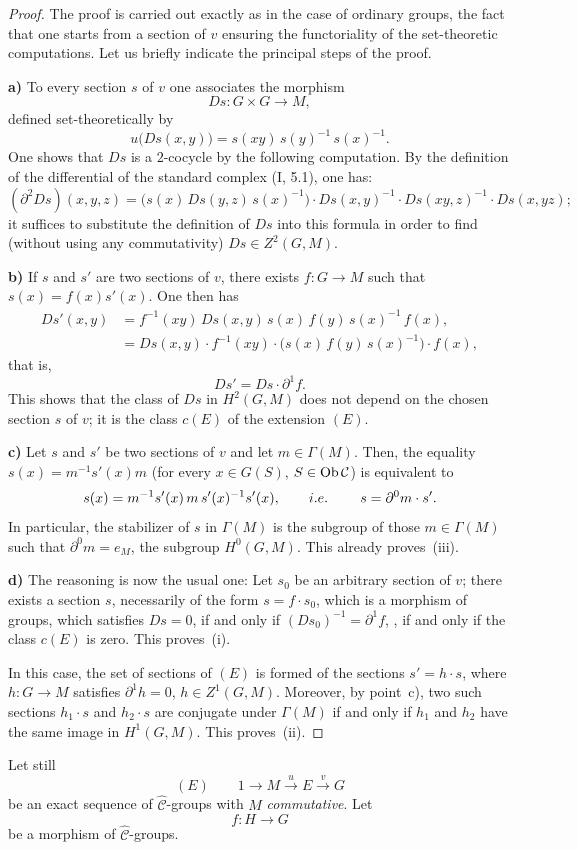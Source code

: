 \begin{proof}
The proof is carried out exactly as in the case of ordinary groups, the
fact that one starts from a section of \(v\) ensuring the functoriality of
the set-theoretic computations. Let us briefly indicate the principal steps
of the proof.

\textbf{a)} To every section \(s\) of \(v\) one associates the morphism
\[
Ds\colon G\times G\longrightarrow M,
\]
defined set-theoretically by
\[
u\bigl(Ds(x, y)\bigr)=s(xy)\,s(y)^{-1}\,s(x)^{-1}.
\]
One shows that \(Ds\) is a \(2\)-cocycle by the following
computation.%
{\renewcommand{\thefootnote}{(43)}}
By the definition of the differential of the standard complex (I, 5.1), one
has:
\[
(\partial^{2}Ds)(x, y, z)
  =\bigl(s(x)\,Ds(y, z)\,s(x)^{-1}\bigr)
  \cdot Ds(x, y)^{-1}
  \cdot Ds(xy, z)^{-1}
  \cdot Ds(x, yz);
\]
it suffices to substitute the definition of \(Ds\) into this formula in
order to find (without using any commutativity) \(Ds\in Z^{2}(G, M)\).

\textbf{b)} If \(s\) and \(s'\) are two sections of \(v\), there exists
\(f\colon G\to M\) such that \(s(x)=f(x)s'(x)\). One then has
\begin{align*}
Ds'(x, y)
  &=f^{-1}(xy)\,Ds(x, y)\,s(x)\,f(y)\,s(x)^{-1}\,f(x),\\
  &=Ds(x, y)\cdot f^{-1}(xy)
    \cdot\bigl(s(x)\,f(y)\,s(x)^{-1}\bigr)\cdot f(x),
\end{align*}
that is,
\[
Ds'=Ds\cdot\partial^{1}f.
\]
{\renewcommand{\thefootnote}{(44)}}
This shows that the class of \(Ds\) in \(H^{2}(G, M)\) does not depend on the
chosen section \(s\) of \(v\); it is the class \(c(E)\) of the extension
\((E)\).

\textbf{c)} Let \(s\) and \(s'\) be two sections of \(v\) and let
\(m\in\Gamma(M)\). Then, the equality \(s(x)=m^{-1}s'(x)m\) (for every
\(x\in G(S)\), \(S\in\operatorname{Ob}\mathcal{C}\)) is equivalent to
\[
s(x)=m^{-1}s'(x)\,m\,s'(x)^{-1}s'(x),
\qquad i.e.\kern.3em\qquad
s=\partial^{0}m\cdot s'.
\]
In particular, the stabilizer of \(s\) in \(\Gamma(M)\) is the subgroup of
those \(m\in\Gamma(M)\) such that \(\partial^{0}m=e_{M}\), \ie the subgroup
\(H^{0}(G, M)\). This already proves~(iii).

\textbf{d)} The reasoning is now the usual one:%
{\renewcommand{\thefootnote}{(45)}}
Let \(s_{0}\) be an arbitrary section of \(v\); there exists a section
\(s\), necessarily of the form \(s=f\cdot s_{0}\), which is a morphism of
groups, \ie which satisfies \(Ds=0\), if and only if
\((Ds_{0})^{-1}=\partial^{1}f\), \ie, if and only if the class \(c(E)\) is
zero. This proves~(i).

In this case, the set of sections of \((E)\) is formed of the sections
\(s'=h\cdot s\), where \(h\colon G\to M\) satisfies \(\partial^{1}h=0\),
\ie \(h\in Z^{1}(G, M)\). Moreover, by point~c), two such sections
\(h_{1}\cdot s\) and \(h_{2}\cdot s\) are conjugate under \(\Gamma(M)\) if
and only if \(h_{1}\) and \(h_{2}\) have the same image in
\(H^{1}(G, M)\). This proves~(ii).
\end{proof}

Let still
\[
(E)\qquad
1\longrightarrow M\xrightarrow{u}E\xrightarrow{v}G
\]
be an exact sequence of \(\widehat{\mathcal{C}}\)-groups with \(M\)
\emph{commutative}. Let
\[
f\colon H\longrightarrow G
\]
be a morphism of \(\widehat{\mathcal{C}}\)-groups.
